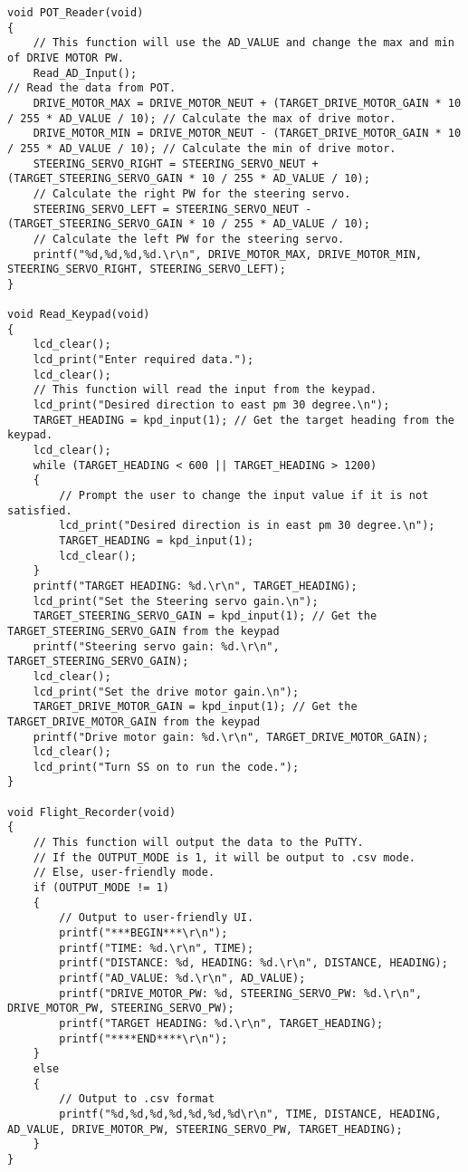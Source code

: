 \documentclass[12pt]{article}
\begin{document}
\begin{lstlisting}
void POT_Reader(void)
{
    // This function will use the AD_VALUE and change the max and min of DRIVE MOTOR PW.
    Read_AD_Input();                                                                           // Read the data from POT.
    DRIVE_MOTOR_MAX = DRIVE_MOTOR_NEUT + (TARGET_DRIVE_MOTOR_GAIN * 10 / 255 * AD_VALUE / 10); // Calculate the max of drive motor.
    DRIVE_MOTOR_MIN = DRIVE_MOTOR_NEUT - (TARGET_DRIVE_MOTOR_GAIN * 10 / 255 * AD_VALUE / 10); // Calculate the min of drive motor.
    STEERING_SERVO_RIGHT = STEERING_SERVO_NEUT + (TARGET_STEERING_SERVO_GAIN * 10 / 255 * AD_VALUE / 10);
    // Calculate the right PW for the steering servo.
    STEERING_SERVO_LEFT = STEERING_SERVO_NEUT - (TARGET_STEERING_SERVO_GAIN * 10 / 255 * AD_VALUE / 10);
    // Calculate the left PW for the steering servo.
    printf("%d,%d,%d,%d.\r\n", DRIVE_MOTOR_MAX, DRIVE_MOTOR_MIN, STEERING_SERVO_RIGHT, STEERING_SERVO_LEFT);
}

void Read_Keypad(void)
{
    lcd_clear();
    lcd_print("Enter required data.");
    lcd_clear();
    // This function will read the input from the keypad.
    lcd_print("Desired direction to east pm 30 degree.\n");
    TARGET_HEADING = kpd_input(1); // Get the target heading from the keypad.
    lcd_clear();
    while (TARGET_HEADING < 600 || TARGET_HEADING > 1200)
    {
        // Prompt the user to change the input value if it is not satisfied.
        lcd_print("Desired direction is in east pm 30 degree.\n");
        TARGET_HEADING = kpd_input(1);
        lcd_clear();
    }
    printf("TARGET HEADING: %d.\r\n", TARGET_HEADING);
    lcd_print("Set the Steering servo gain.\n");
    TARGET_STEERING_SERVO_GAIN = kpd_input(1); // Get the TARGET_STEERING_SERVO_GAIN from the keypad
    printf("Steering servo gain: %d.\r\n", TARGET_STEERING_SERVO_GAIN);
    lcd_clear();
    lcd_print("Set the drive motor gain.\n");
    TARGET_DRIVE_MOTOR_GAIN = kpd_input(1); // Get the TARGET_DRIVE_MOTOR_GAIN from the keypad
    printf("Drive motor gain: %d.\r\n", TARGET_DRIVE_MOTOR_GAIN);
    lcd_clear();
    lcd_print("Turn SS on to run the code.");
}

void Flight_Recorder(void)
{
    // This function will output the data to the PuTTY.
    // If the OUTPUT_MODE is 1, it will be output to .csv mode.
    // Else, user-friendly mode.
    if (OUTPUT_MODE != 1)
    {
        // Output to user-friendly UI.
        printf("***BEGIN***\r\n");
        printf("TIME: %d.\r\n", TIME);
        printf("DISTANCE: %d, HEADING: %d.\r\n", DISTANCE, HEADING);
        printf("AD_VALUE: %d.\r\n", AD_VALUE);
        printf("DRIVE_MOTOR_PW: %d, STEERING_SERVO_PW: %d.\r\n", DRIVE_MOTOR_PW, STEERING_SERVO_PW);
        printf("TARGET HEADING: %d.\r\n", TARGET_HEADING);
        printf("****END****\r\n");
    }
    else
    {
        // Output to .csv format
        printf("%d,%d,%d,%d,%d,%d,%d\r\n", TIME, DISTANCE, HEADING, AD_VALUE, DRIVE_MOTOR_PW, STEERING_SERVO_PW, TARGET_HEADING);
    }
}


\end{lstlisting}
\end{document}
